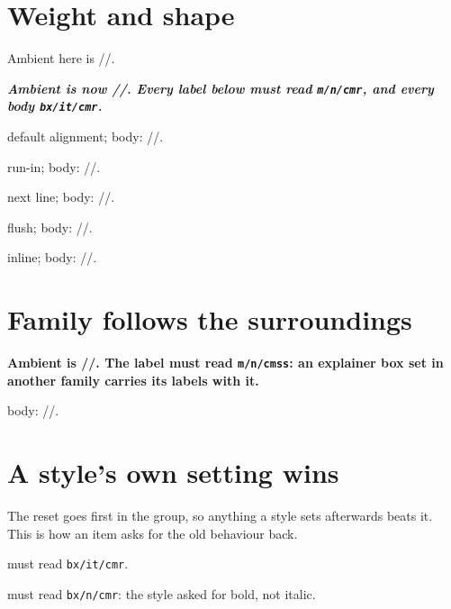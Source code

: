\documentclass{article}
\makeatletter
\DeclareRobustCommand\fs{\f@series/\f@shape/\f@family}
\makeatother
\begin{document}
\section{Weight and shape}

Ambient here is \fs.

{\bfseries\itshape
Ambient is now \fs.  Every label below must read \texttt{m/n/cmr}, and every
body \texttt{bx/it/cmr}.

\begin{prop}
  \item[\fs] default alignment; body: \fs.
\end{prop}
\begin{prop}[align=runin]\item[\fs] run-in; body: \fs.\end{prop}
\begin{prop}[align=nextline]\item[\fs] next line; body: \fs.\end{prop}
\begin{prop}[align=flush]\item[\fs] flush; body: \fs.\end{prop}
\begin{inlineprop}\item[\fs] inline; body: \fs.\end{inlineprop}
}

\section{Family follows the surroundings}

{\sffamily\bfseries
Ambient is \fs.  The label must read \texttt{m/n/cmss}: an explainer box set
in another family carries its labels with it.
\begin{prop}\item[\fs] body: \fs.\end{prop}}

\section{A style's own setting wins}

The reset goes first in the group, so anything a style sets afterwards beats
it.  This is how an item asks for the old behaviour back.

{\bfseries\itshape
\begin{prop}[label format = {\bfseries\itshape #1}]
  \item[\fs] must read \texttt{bx/it/cmr}.
\end{prop}
\begin{prop}[display format = {\textbf{#1}}]
  \item[\fs] must read \texttt{bx/n/cmr}: the style asked for bold, not italic.
\end{prop}}
\end{document}
